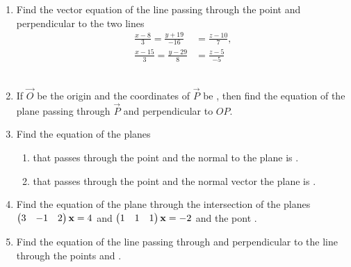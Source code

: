 \documentclass[journal,12pt,twocolumn]{IEEEtran}
\renewcommand\thesection{\arabic{section}}
\begin{document}
\begin{enumerate}[label=\thesection.\arabic*.,ref=\thesection.\theenumi]
\solution
%
\item Find the vector equation of the line passing through the point  and perpendicular to the two lines
\begin{align}
\frac{x-8}{3} = \frac{y+19}{-16} &= \frac{z-10}{7}, 
\\
\frac{x-15}{3} = \frac{y-29}{8} &= \frac{z-5}{-5} 
\end{align}
%
\\
\solution
%
\item If $\vec{O}$ be the origin and the coordinates of $\vec{P}$ be , then find the equation of the plane passing through $\vec{P}$ and perpendicular to $OP$.
%
\\
\solution
%
\item Find the equation of the planes
\begin{enumerate}
\item that passes through the point  and the normal to the plane is .
\\
\solution
%
\item that passes through the point  and the normal vector the plane is .
\solution
%

\end{enumerate}
\item Find the equation of the plane through the intersection of the planes 
$
\begin{pmatrix}3 & -1 & 2\end{pmatrix}\mathbf{x}=4
$
 and 
$
\begin{pmatrix}1 & 1 & 1\end{pmatrix}\mathbf{x}=-2
$
and the pont .
%
\\
\solution
%
\item Find the equation of the line passing through  and perpendicular to the line through the points  and .
%
\solution
%
\end{enumerate}
\end{document}
